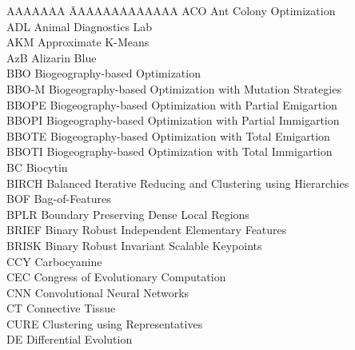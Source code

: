 

\begin{nomenclature}


\fontsize{12}{10}
\doublespacing 
 \begin{tabbing}

 AAAAAAA \= AAAAAAAAAAAAA \kill
ACO	\> \quad \quad\quad	Ant Colony Optimization	\\
ADL	\> \quad \quad\quad	 Animal Diagnostics Lab	\\
AKM	\> \quad \quad\quad	Approximate K-Means	\\
AzB	\> \quad \quad\quad	Alizarin Blue	\\
BBO	\> \quad \quad\quad	Biogeography-based Optimization	\\
BBO-M	\> \quad \quad\quad	Biogeography-based Optimization with Mutation Strategies	\\
BBOPE	\> \quad \quad\quad	Biogeography-based Optimization with Partial Emigartion	\\
BBOPI	\> \quad \quad\quad	Biogeography-based Optimization with Partial Immigartion	\\
BBOTE	\> \quad \quad\quad	Biogeography-based Optimization with Total Emigartion	\\
BBOTI	\> \quad \quad\quad	Biogeography-based Optimization with Total Immigartion	\\
BC	\> \quad \quad\quad	Biocytin	\\
BIRCH	\> \quad \quad\quad	Balanced Iterative Reducing and Clustering using Hierarchies	\\
BOF	\> \quad \quad\quad	Bag-of-Features	\\
BPLR	\> \quad \quad\quad	Boundary Preserving Dense Local Regions	\\
BRIEF	\> \quad \quad\quad	Binary Robust Independent Elementary Features	\\
BRISK	\> \quad \quad\quad	Binary Robust Invariant Scalable Keypoints	\\
CCY	\> \quad \quad\quad	Carbocyanine	\\
CEC	\> \quad \quad\quad	Congress of Evolutionary Computation	\\
CNN	\> \quad \quad\quad	Convolutional Neural Networks	\\
CT	\> \quad \quad\quad	Connective Tissue	\\
CURE	\> \quad \quad\quad	Clustering using Representatives	\\
DE	\> \quad \quad\quad	Differential Evolution	\\

\end{tabbing}
\end{nomenclature}
